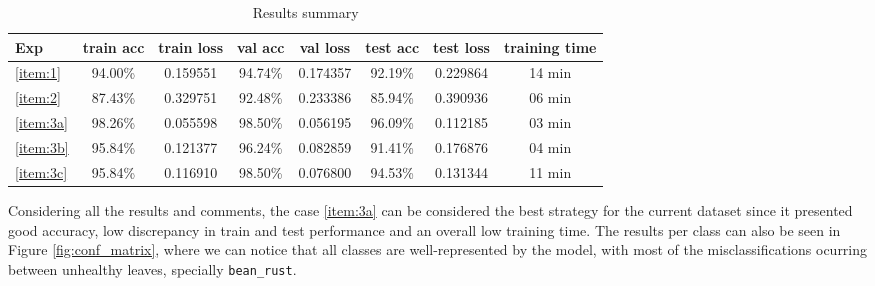 \documentclass[10pt, a4paper]{article}
\begin{document}

\begin{table}[htpb]
  \centering
  \begin{tabular}{l|c|c|c|c|c|c|c|}
    Exp             &	train acc	       & train loss	    & val acc  & val loss	 & test acc	 & test loss & training time \\
    \hline
    \ref{item:1}    & 94.00\%          & 0.159551       & 94.74\%  & 0.174357  & 92.19\%   & 0.229864  & 14 min        \\
    \ref{item:2}    & 87.43\%          & 0.329751       & 92.48\%  & 0.233386  & 85.94\%   & 0.390936  & 06 min        \\
    \ref{item:3a}   & 98.26\%          & 0.055598       & 98.50\%  & 0.056195  & 96.09\%   & 0.112185  & 03 min        \\
    \ref{item:3b}   & 95.84\%          & 0.121377       & 96.24\%  & 0.082859  & 91.41\%   & 0.176876  & 04 min        \\
    \ref{item:3c}   & 95.84\%          & 0.116910       & 98.50\%  & 0.076800  & 94.53\%   & 0.131344  & 11 min        \\
    \hline
  \end{tabular}
  \caption{Results summary}
  \label{tab:results_summ}
\end{table}

Considering all the results and comments, the case \ref{item:3a} can be considered the best strategy for the current dataset since it presented good accuracy, low discrepancy in 
train and test performance and an overall low training time. The results per class can also be seen in Figure \ref{fig:conf_matrix}, where we can notice that all classes
are well-represented by the model, with most of the misclassifications ocurring between unhealthy leaves, specially {\tt bean\_rust}.
\end{document}
